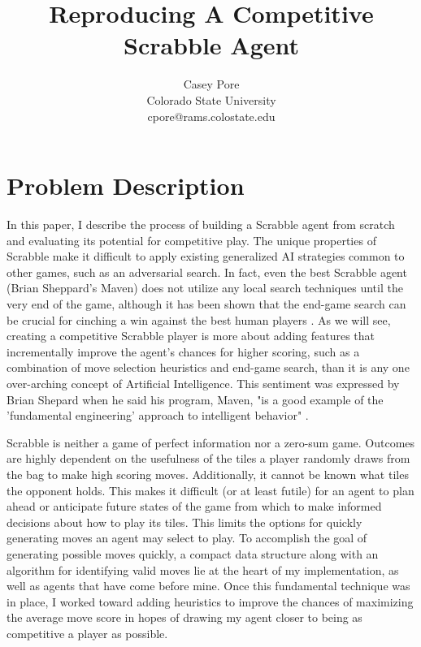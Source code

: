\documentclass[letterpaper]{article}
\title{Reproducing A Competitive Scrabble Agent}
\author{Casey Pore \\
Colorado State University\\
cpore@rams.colostate.edu\\
}
\begin{document}
\maketitle


\section{Problem Description}
In this paper, I describe the process of building a Scrabble agent from scratch and evaluating its potential for competitive play. The unique properties of Scrabble make it difficult to apply existing generalized AI strategies common to other games, such as an adversarial search. In fact, even the best Scrabble agent (Brian Sheppard's Maven) does not utilize any local search techniques until the very end of the game, although it has been shown that the end-game search can be crucial for cinching a win against the best human players \cite{1sheppard2002}. As we will see, creating a competitive Scrabble player is more about adding features that incrementally improve the agent's chances for higher scoring, such as a combination of move selection heuristics and end-game search, than it is any one over-arching concept of Artificial Intelligence. This sentiment was expressed by Brian Shepard when he said his program, Maven, "is a good example of the 'fundamental engineering' approach to intelligent behavior" \cite{1sheppard2002}.

Scrabble is neither a game of perfect information nor a zero-sum game. Outcomes are highly dependent on the usefulness of the tiles a player randomly draws from the bag to make high scoring moves. Additionally, it cannot be known what tiles the opponent holds. This makes it difficult (or at least futile) for an agent to plan ahead or anticipate future states of the game from which to make informed decisions about how to play its tiles. This limits the options for quickly generating moves an agent may select to play. To accomplish the goal of generating possible moves quickly, a compact data structure along with an algorithm for identifying valid moves lie at the heart of my implementation, as well as agents that have come before mine. Once this fundamental technique was in place, I worked toward adding heuristics to improve the chances of maximizing the average move score in hopes of drawing my agent closer to being as competitive a player as possible.
\end{document}
